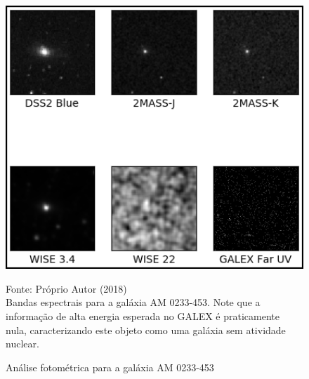 \begin{figure}[H]
	\centering	
    \caption{Análise fotométrica para a galáxia AM 0233-453}
    \includegraphics[width=1.0\textwidth]{figuras/am0233-453.png}
    \begin{center}
        \normalsize Fonte: Próprio Autor (2018)\\Bandas espectrais para a galáxia AM 0233-453. Note que a informação de alta energia esperada no GALEX é praticamente nula, caracterizando este objeto como uma galáxia sem atividade nuclear.
    \end{center}
	\label{fig:sbmt-moses}
\end{figure}

